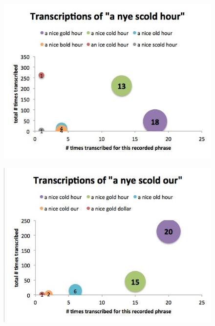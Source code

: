 \begin{figure}[h]
\begin{center}
\includegraphics[width=\piechartwidth]{bubbleChartTranscriptionFrequency_aNyeScoldHour.jpg}
\captionfonts
\caption[Most common transcriptions for the recorded phrase "aNyeScoldHour"]{}
\label{bubbleChart:aNyeScoldHour}
\end{center}
\end{figure}

\begin{figure}[h]
\begin{center}
\includegraphics[width=\piechartwidth]{bubbleChartTranscriptionFrequency_aNyeScoldOur.jpg}
\captionfonts
\caption[Most common transcriptions for the recorded phrase "aNyeScoldOur"]{}
\label{bubbleChart:aNyeScoldOur}
\end{center}
\end{figure}

